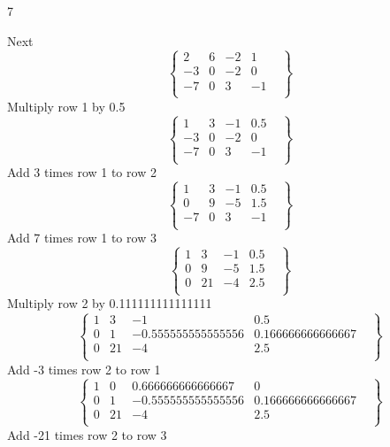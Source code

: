 \documentclass{exercises}
\begin{document}
\begin{exr}{}{7}
\begin{enumerate}
Next
\begin{equation}
\left\{
    \begin{array}{ccc|cl}2&6&-2&1&\\-3&0&-2&0&\\-7&0&3&-1&\\\end{array}
\right\}
\end{equation}Multiply row 1 by 0.5
\begin{equation}
\left\{
    \begin{array}{ccc|cl}1&3&-1&0.5&\\-3&0&-2&0&\\-7&0&3&-1&\\\end{array}
\right\}
\end{equation}Add 3 times row 1 to row 2
\begin{equation}
\left\{
    \begin{array}{ccc|cl}1&3&-1&0.5&\\0&9&-5&1.5&\\-7&0&3&-1&\\\end{array}
\right\}
\end{equation}Add 7 times row 1 to row 3
\begin{equation}
\left\{
    \begin{array}{ccc|cl}1&3&-1&0.5&\\0&9&-5&1.5&\\0&21&-4&2.5&\\\end{array}
\right\}
\end{equation}Multiply row 2 by 0.111111111111111
\begin{equation}
\left\{
    \begin{array}{ccc|cl}1&3&-1&0.5&\\0&1&-0.555555555555556&0.166666666666667&\\0&21&-4&2.5&\\\end{array}
\right\}
\end{equation}Add -3 times row 2 to row 1
\begin{equation}
\left\{
    \begin{array}{ccc|cl}1&0&0.666666666666667&0&\\0&1&-0.555555555555556&0.166666666666667&\\0&21&-4&2.5&\\\end{array}
\right\}
\end{equation}Add -21 times row 2 to row 3

\end{enumerate}
\end{exr}
\end{document}
